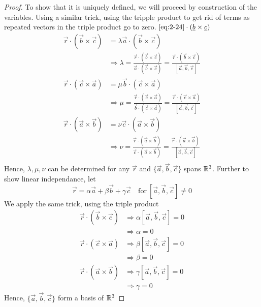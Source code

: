 \documentclass{article}
\numberwithin{equation}{section}
\begin{document}
\begin{proof}
    To show that it is uniquely defined, we will proceed by construction of the variables. Using a similar trick, using the tripple product to get rid of terms as repeated vectors in the triple product go to zero. $\eqref{eq:2-24} \cdot (\vec{b} \times \vec{c})$
    \begin{align*}
        \vec{r} \cdot (\vec{b} \times \vec{c}) &= \lambda \vec{a} \cdot (\vec{b} \times \vec{c}) \\
        &\Rightarrow \lambda = \frac{\vec{r} \cdot (\vec{b} \times \vec{c})}{\vec{a} \cdot (\vec{b} \times \vec{c})} = \frac{\vec{r} \cdot (\vec{b} \times \vec{c})}{[\vec{a}, \vec{b}, \vec{c}]}\\
        \vec{r} \cdot (\vec{c} \times \vec{a}) &= \mu \vec{b} \cdot (\vec{c} \times \vec{a}) \\
        &\Rightarrow \mu = \frac{\vec{r} \cdot (\vec{c} \times \vec{a})}{\vec{b} \cdot (\vec{c} \times \vec{a})}  = \frac{\vec{r} \cdot (\vec{c} \times \vec{a})}{[\vec{a}, \vec{b}, \vec{c}]} \\
        \vec{r} \cdot (\vec{a} \times \vec{b}) &= \nu \vec{c} \cdot (\vec{a} \times \vec{b}) \\
        &\Rightarrow \nu = \frac{\vec{r} \cdot (\vec{a} \times \vec{b})}{\vec{c} \cdot (\vec{a} \times \vec{b})}  = \frac{\vec{r} \cdot (\vec{a} \times \vec{b})}{[\vec{a}, \vec{b}, \vec{c}]} \\
    \end{align*}
    Hence, $\lambda, \mu, \nu$ can be determined for any $\vec{r}$ and $\{\vec{a}, \vec{b}, \vec{c}\}$ spans $\R^3$.
    Further to show linear independance, let 
    \[
        \vec{r} = \alpha \vec{a} + \beta \vec{b} + \gamma \vec{c} \quad \text{for} \ [\vec{a}, \vec{b}, \vec{c}] \neq 0
    \]
    We apply the same trick, using the triple product
    \begin{align*}
        \vec{r} \cdot (\vec{b} \times \vec{c}) &\Rightarrow \alpha [\vec{a}, \vec{b}, \vec{c}] = 0 \\
        &\Rightarrow \alpha = 0 \\
        \vec{r} \cdot (\vec{c} \times \vec{a}) &\Rightarrow \beta [\vec{a}, \vec{b}, \vec{c}] = 0 \\
        &\Rightarrow \beta = 0 \\
        \vec{r} \cdot (\vec{a} \times \vec{b}) &\Rightarrow \gamma [\vec{a}, \vec{b}, \vec{c}] = 0 \\
        &\Rightarrow \gamma = 0
    \end{align*}
    Hence, $\{\vec{a}, \vec{b}, \vec{c}\}$ form a basis of $\R^3$
\end{proof}
\end{document}
